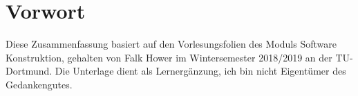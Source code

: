 \section{Vorwort}

Diese Zusammenfassung basiert auf den Vorlesungsfolien des Moduls Software Konstruktion, gehalten von Falk Hower im 
Wintersemester 2018/2019 an der TU-Dortmund.
Die Unterlage dient als Lernergänzung, ich bin nicht Eigentümer des Gedankengutes.
